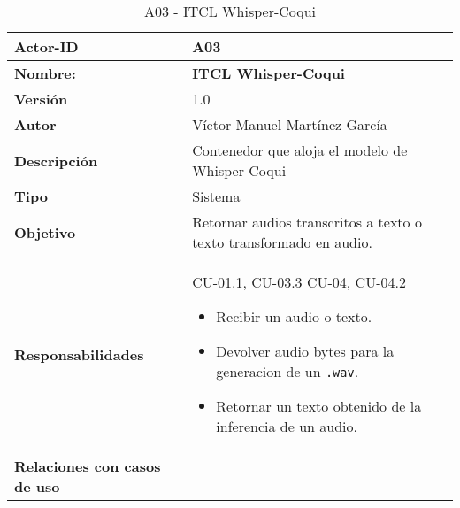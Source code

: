 \begin{table}[H]
	\centering
	\begin{tabularx}{\linewidth}{ p{} p{} }
		\toprule
		\textbf{Actor-ID}    & A03 \\
		\toprule
		\textbf{Nombre: } 			  & \textbf{ITCL Whisper-Coqui} \\
		\textbf{Versión}              & 1.0    \\
		\textbf{Autor}                & Víctor Manuel Martínez García \\
		\textbf{Descripción}          & Contenedor que aloja el modelo de Whisper-Coqui\\
		\textbf{Tipo}                 & Sistema \\
		\textbf{Objetivo}             & Retornar audios transcritos a texto o texto transformado en audio. \\
		\textbf{Responsabilidades}    & \hyperref[CU-01.1 Capturar prompt por voz]{CU-01.1}, \hyperref[CU-03.3 Confirmar ejecucion al usuario]{CU-03.3}\hyperref[CU-04 Responder al usuario por voz]{ CU-04}, \hyperref[CU-04.2 Transformar texto en audio]{CU-04.2}
		\begin{itemize}
			\tightlist
			\item Recibir un audio o texto.
            \item Devolver audio bytes para la generacion de un \texttt{.wav}.
            \item Retornar un texto obtenido de la inferencia de un audio.
		\end{itemize}\\
		\textbf{Relaciones con casos de uso} & \\
		\bottomrule
	\end{tabularx}
	\caption{A03 - ITCL Whisper-Coqui}
	\label{actor:ITCL Whisper-Coqui}
\end{table}


